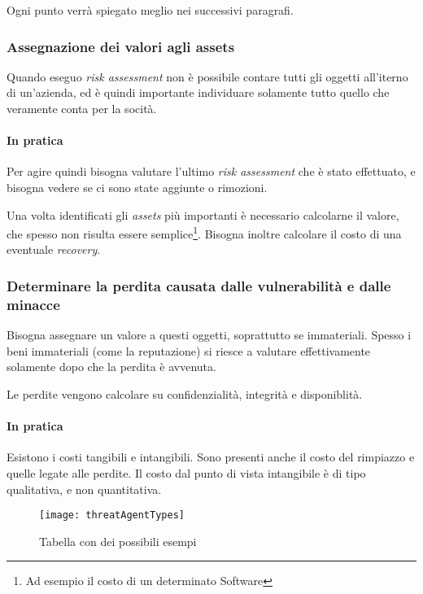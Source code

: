 Ogni punto verr\`a spiegato meglio nei successivi paragrafi.


\subsubsection{Assegnazione dei valori agli assets}

Quando eseguo \textit{risk assessment} non è possibile contare tutti gli oggetti
all'iterno di un'azienda, ed è quindi importante individuare solamente tutto
quello che veramente conta per la socità.

\paragraph*{In pratica}

Per agire quindi bisogna valutare l'ultimo \textit{risk assessment} che è stato
effettuato, e bisogna vedere se ci sono state aggiunte o rimozioni.

Una volta identificati gli \textit{assets} più importanti è necessario
calcolarne il valore, che spesso non risulta essere semplice\footnote{Ad esempio
il costo di un determinato Software}. Bisogna inoltre calcolare il costo di una
eventuale \textit{recovery}.



\subsubsection{Determinare la perdita causata dalle vulnerabilità e dalle
minacce}

Bisogna assegnare un valore a questi oggetti, soprattutto se immateriali. Spesso
i beni immateriali (come la reputazione) si riesce a valutare effettivamente
solamente dopo che la perdita è avvenuta.

Le perdite vengono calcolare su confidenzialità, integrità e disponiblità.

\paragraph*{In pratica}

Esistono i costi tangibili e intangibili. Sono presenti anche il costo del
rimpiazzo e quelle legate alle perdite.
Il costo dal punto di vista intangibile è di tipo qualitativa, e non
quantitativa.

\begin{figure}[H]
 \centering
 \texttt{[image: threatAgentTypes]}
 \caption{Tabella con dei possibili esempi}
\end{figure}


